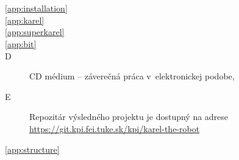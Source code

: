 
\chapter*{\appendixlistname}

\begin{description}

   \item[\autoref{app:installation}] 
   \item[\autoref{app:karel}] 
   \item[\autoref{app:superkarel}] 
   \item[\autoref{app:bit}] 
   \item[\appendixname{} D] CD médium -- záverečná práca v~elektronickej podobe,
   \item[\appendixname{} E] Repozitár výsledného projektu je dostupný na adrese\\ \url{https://git.kpi.fei.tuke.sk/kpi/karel-the-robot}
   \item[\autoref{app:structure}] 
\end{description}
